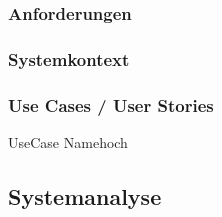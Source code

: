 \subsubsection{Anforderungen}


\subsubsection{Systemkontext}


\subsubsection{Use Cases / User Stories}



\begin{usecase}{1}{UseCase Name}{hoch}
\end{usecase}

\subsection{Systemanalyse}


